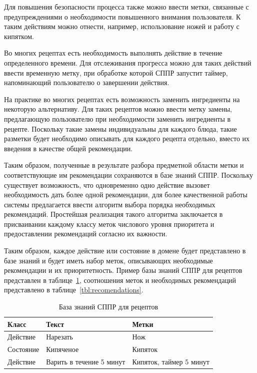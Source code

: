 Для повышения безопасности процесса также можно ввести метки, связанные с предупреждениями о необходимости повышенного внимания пользователя.
К таким действиям можно отнести, например, использование ножей и работу с кипятком.

Во многих рецептах есть необходимость выполнять действие в течение определенного времени.
Для отслеживания прогресса можно для таких действий ввести временную метку, при обработке которой СППР запустит таймер, напоминающий пользователю о завершении действия.

На практике во многих рецептах есть возможность заменить ингредиенты на некоторую альтернативу.
Для таких рецептов можно ввести метку замены, предлагающую пользователю при необходимости заменить ингредиенты в рецепте.
Поскольку такие замены индивидуальны для каждого блюда, такие разметки будет необходимо описывать для каждого рецепта отдельно, вместо их введения в качестве общей рекомендации. 

Таким образом, полученные в результате разбора предметной области метки и соответствующие им рекомендации сохраняются в базе знаний СППР. 
Поскольку существует возможность, что одновременно одно действие вызовет необходимость дать более одной рекомендации, для более качественной работы системы предлагается ввести алгоритм выбора порядка необходимых рекомендаций.
Простейшая реализация такого алгоритма заключается в присваивании каждому классу меток числового уровня приоритета и предоставлении рекомендаций согласно их важности.

Таким образом, каждое действие или состояние в домене будет представлено в базе знаний и будет иметь набор меток, описывающих необходимые рекомендации и их приоритетность.
\clearpage
Пример базы знаний СППР для рецептов представлен в таблице~\ref{tbl:marks}, соотношения меток и необходимых рекомендаций представлено в таблице~\ref{tbl:recomendations}.   

\begin{table}[h]
	\centering
	\begin{threeparttable}
		\caption{База знаний СППР для рецептов}
		\label{tbl:marks}
		
		\begin{tabularx}{\textwidth}{|X|X|X|}
			\hline
			\textbf{Класс}    & \textbf{Текст}                    & \textbf{Метки}                   \\
			\hline
			Действие  & Нарезать                 & Нож                     \\
			\hline
			Состояние & Кипяченое                & Кипяток                 \\
			\hline
			Действие  & Варить в течение 5 минут & Кипяток, таймер 5 минут \\
			\hline
		\end{tabularx}
	\end{threeparttable}
\end{table}

